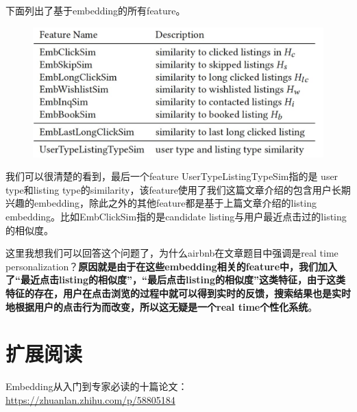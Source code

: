 \documentclass[12pt]{article}
\begin{document}
下面列出了基于embedding的所有feature。
\begin{figure}[H]
    \centering
    \includegraphics[width=1\textwidth]{fig/Airbnb_Embedding_Features.png}
\end{figure}

我们可以很清楚的看到，最后一个feature UserTypeListingTypeSim指的是 user type和listing type的similarity，该feature使用了我们这篇文章介绍的包含用户长期兴趣的embedding，除此之外的其他feature都是基于上篇文章介绍的listing embedding。比如EmbClickSim指的是candidate listing与用户最近点击过的listing的相似度。

这里我想我们可以回答这个问题了，为什么airbnb在文章题目中强调是real time personalization？\textbf{原因就是由于在这些embedding相关的feature中，我们加入了“最近点击listing的相似度”，“最后点击listing的相似度”这类特征，由于这类特征的存在，用户在点击浏览的过程中就可以得到实时的反馈，搜索结果也是实时地根据用户的点击行为而改变，所以这无疑是一个real time个性化系统}。


\section{扩展阅读}
Embedding从入门到专家必读的十篇论文：\url{https://zhuanlan.zhihu.com/p/58805184}



\end{document}
